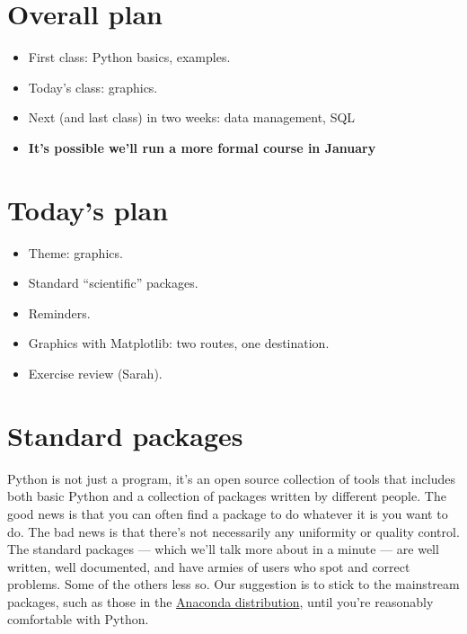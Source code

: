 \documentclass[11pt]{article}
\begin{document}
\section{Overall plan}

\begin{itemize}
\item First class:  Python basics, examples.
\item Today's class:  graphics.
\item Next (and last class) in two weeks:  data management, SQL
\item {\bf It's possible we'll run a more formal course in January}
\end{itemize}


\section{Today's plan}

\begin{itemize}
\item Theme:  graphics.
\item Standard ``scientific'' packages.
\item Reminders.
\item Graphics with Matplotlib: two routes, one destination.
\item Exercise review (Sarah).
\end{itemize}


\section{Standard packages}

Python is not just a program, it's an open source collection of tools
that includes both basic
Python and a collection of packages written by different people.
The good news is that you can often find a package to do whatever it is
you want to do.
The bad news is that there's not necessarily any uniformity or quality control.
The standard packages --- which we'll talk more about in a minute ---
are well written, well documented, and have armies of users who spot and correct
problems.
Some of the others less so.
Our suggestion is to stick to the mainstream packages, such as those in the
\href{http://docs.continuum.io/anaconda/pkg-docs.html}{Anaconda distribution},
until you're reasonably comfortable with Python.
\end{document}
